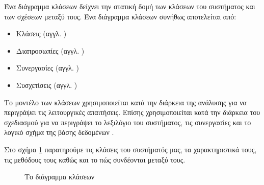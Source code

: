 \documentclass{assignment}
\begin{document}
Ένα διάγραμμα κλάσεων δείχνει την στατική δομή των κλάσεων του συστήματος και των σχέσεων μεταξύ τους. Ένα διάγραμμα κλάσεων συνήθως αποτελείται από:

\begin{itemize}
\item Κλάσεις (αγγλ. )
\item Διαπροσωπίες (αγγλ. )
\item Συνεργασίες (αγγλ. )
\item Συσχετίσεις (αγγλ. )
\end{itemize}

Το μοντέλο των κλάσεων χρησιμοποιείται κατά την διάρκεια της ανάλυσης για να περιγράψει τις λειτουργικές απαιτήσεις. Επίσης χρησιμοποιείται κατά την διάρκεια του σχεδιασμού για να περιγράψει το λεξιλόγιο του συστήματος, τις συνεργασίες και το λογικό σχήμα της βάσης δεδομένων \cite{Rumbaugh:2004:UML:993859}.

Στο σχήμα \ref{fig:class_diagramm} παρατηρούμε τις κλάσεις του συστήματός μας, τα χαρακτηριστικά τους, τις μεθόδους τους καθώς και το πώς συνδέονται μεταξύ τους.

\begin{figure}
\begin{center}
\caption{Το διάγραμμα κλάσεων}
\label{fig:class_diagramm}
\end{center}
\end{figure}

 \label{Βιβλιογραφία}



\newpage
\end{document}
